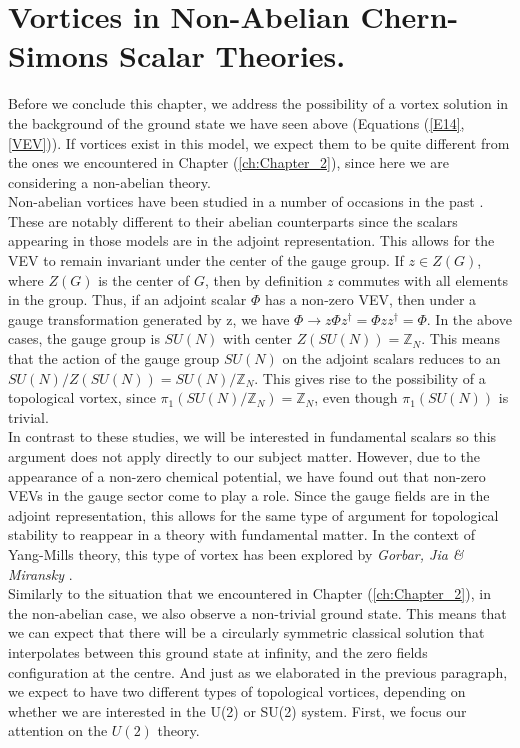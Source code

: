 \section{Vortices in Non-Abelian Chern-Simons Scalar Theories.}
Before we conclude this chapter, we address the possibility of a vortex solution in the background of the ground state we have seen above (Equations (\ref{E14}, \ref{VEV})). If vortices exist in this model, we expect them to be quite different from the ones we encountered in Chapter (\ref{ch:Chapter_2}), since here we are considering a non-abelian theory. \\
\indent Non-abelian vortices have been studied in a number of occasions in the past \cite{deVega:1986eu, Kumar:1986yz, Blazquez-Salcedo:2013roa, NavarroLerida:2009dm}. These are notably different to their abelian counterparts since the scalars appearing in those models are in the adjoint representation. This allows for the VEV to remain invariant under the center of the gauge group. If $z\in Z(G)$, where $Z(G)$ is the center of $G$, then by definition $z$ commutes with all elements in the group. Thus, if an adjoint scalar $\Phi$ has a non-zero VEV, then under a gauge transformation generated by z, we have $\Phi \rightarrow z\Phi z^{\dag} =\Phi z z^{\dag} = \Phi$. In the above cases, the gauge group is $SU(N)$ with center $Z(SU(N)) =\mathbb{Z}_N$. This means that the action of the gauge group $SU(N)$ on the adjoint scalars reduces to an $SU(N)/Z(SU(N))= SU(N)/\mathbb{Z}_N$. This gives rise to the possibility of a topological vortex, since $\pi_1(SU(N)/\mathbb{Z}_N)=\mathbb{Z}_N$, even though $\pi_1(SU(N))$ is trivial.\\
\indent In contrast to these studies, we will be interested in fundamental scalars so this argument does not apply directly to our subject matter. However, due to the appearance of a non-zero chemical potential, we have found out that non-zero VEVs in the gauge sector come to play a role. Since the gauge fields are in the adjoint representation, this allows for the same type of argument for topological stability to reappear in a theory with fundamental matter. In the context of Yang-Mills theory, this type of vortex has been explored by \textit{Gorbar, Jia \& Miransky} \cite{Gorbar:2005pi}.\\  
\indent Similarly to the situation that we encountered in Chapter (\ref{ch:Chapter_2}), in the non-abelian case, we also observe a non-trivial ground state. This means that we can expect that there will be a circularly symmetric classical solution that interpolates between this ground state at infinity, and the zero fields configuration at the centre. And just as we elaborated in the previous paragraph, we expect to have two different types of topological vortices, depending on whether we are interested in the U(2) or SU(2) system. First, we focus our attention on the $U(2)$ theory.
